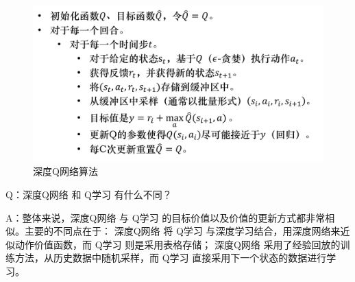 \begin{figure}[hbt]
    \centering
    \includegraphics[width=0.7\linewidth]{res/ch6/6.19}
    \caption{深度Q网络算法}
    \label{fig:fig6.19}
\end{figure}

Q：深度Q网络 和 Q学习 有什么不同？

A：整体来说，深度Q网络 与 Q学习 的目标价值以及价值的更新方式都非常相似。主要的不同点在于：
  深度Q网络 将 Q学习 与深度学习结合，用深度网络来近似动作价值函数，而 Q学习 则是采用表格存储；
  深度Q网络 采用了经验回放的训练方法，从历史数据中随机采样，而 Q学习 直接采用下一个状态的数据进行学习。









